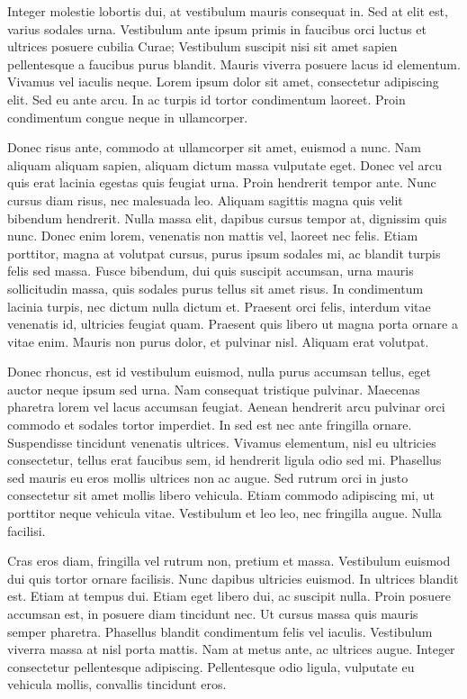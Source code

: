 \documentclass[a4paper]{article}
\begin{document}
Integer molestie lobortis dui, at vestibulum mauris consequat in. Sed at elit est, varius sodales urna. Vestibulum ante ipsum primis in faucibus orci luctus et ultrices posuere cubilia Curae; Vestibulum suscipit nisi sit amet sapien pellentesque a faucibus purus blandit. Mauris viverra posuere lacus id elementum. Vivamus vel iaculis neque. Lorem ipsum dolor sit amet, consectetur adipiscing elit. Sed eu ante arcu. In ac turpis id tortor condimentum laoreet. Proin condimentum congue neque in ullamcorper.

Donec risus ante, commodo at ullamcorper sit amet, euismod a nunc. Nam aliquam aliquam sapien, aliquam dictum massa vulputate eget. Donec vel arcu quis erat lacinia egestas quis feugiat urna. Proin hendrerit tempor ante. Nunc cursus diam risus, nec malesuada leo. Aliquam sagittis magna quis velit bibendum hendrerit. Nulla massa elit, dapibus cursus tempor at, dignissim quis nunc. Donec enim lorem, venenatis non mattis vel, laoreet nec felis. Etiam porttitor, magna at volutpat cursus, purus ipsum sodales mi, ac blandit turpis felis sed massa. Fusce bibendum, dui quis suscipit accumsan, urna mauris sollicitudin massa, quis sodales purus tellus sit amet risus. In condimentum lacinia turpis, nec dictum nulla dictum et. Praesent orci felis, interdum vitae venenatis id, ultricies feugiat quam. Praesent quis libero ut magna porta ornare a vitae enim. Mauris non purus dolor, et pulvinar nisl. Aliquam erat volutpat.

Donec rhoncus, est id vestibulum euismod, nulla purus accumsan tellus, eget auctor neque ipsum sed urna. Nam consequat tristique pulvinar. Maecenas pharetra lorem vel lacus accumsan feugiat. Aenean hendrerit arcu pulvinar orci commodo et sodales tortor imperdiet. In sed est nec ante fringilla ornare. Suspendisse tincidunt venenatis ultrices. Vivamus elementum, nisl eu ultricies consectetur, tellus erat faucibus sem, id hendrerit ligula odio sed mi. Phasellus sed mauris eu eros mollis ultrices non ac augue. Sed rutrum orci in justo consectetur sit amet mollis libero vehicula. Etiam commodo adipiscing mi, ut porttitor neque vehicula vitae. Vestibulum et leo leo, nec fringilla augue. Nulla facilisi.

Cras eros diam, fringilla vel rutrum non, pretium et massa. Vestibulum euismod dui quis tortor ornare facilisis. Nunc dapibus ultricies euismod. In ultrices blandit est. Etiam at tempus dui. Etiam eget libero dui, ac suscipit nulla. Proin posuere accumsan est, in posuere diam tincidunt nec. Ut cursus massa quis mauris semper pharetra. Phasellus blandit condimentum felis vel iaculis. Vestibulum viverra massa at nisl porta mattis. Nam at metus ante, ac ultrices augue. Integer consectetur pellentesque adipiscing. Pellentesque odio ligula, vulputate eu vehicula mollis, convallis tincidunt eros.
\end{document}
